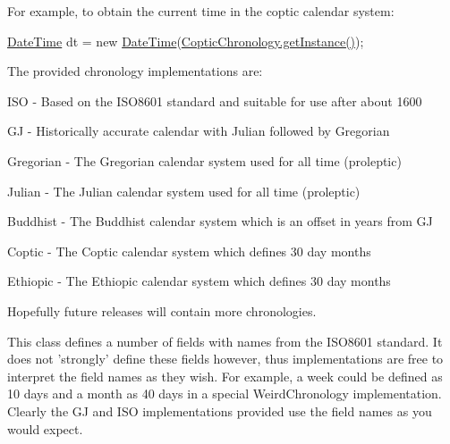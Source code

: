 For example, to obtain the current time in the coptic calendar system\-: 
\begin{DoxyPre}
\hyperlink{classorg_1_1joda_1_1time_1_1_date_time}{DateTime} dt = new \hyperlink{classorg_1_1joda_1_1time_1_1_date_time}{DateTime}(\hyperlink{classorg_1_1joda_1_1time_1_1chrono_1_1_coptic_chronology_a6818667ec3917883f817154fd5f114d9}{CopticChronology.getInstance()});
\end{DoxyPre}
 

The provided chronology implementations are\-: 
\begin{DoxyItemize}
\item I\-S\-O -\/ Based on the I\-S\-O8601 standard and suitable for use after about 1600 
\item G\-J -\/ Historically accurate calendar with Julian followed by Gregorian 
\item Gregorian -\/ The Gregorian calendar system used for all time (proleptic) 
\item Julian -\/ The Julian calendar system used for all time (proleptic) 
\item Buddhist -\/ The Buddhist calendar system which is an offset in years from G\-J 
\item Coptic -\/ The Coptic calendar system which defines 30 day months 
\item Ethiopic -\/ The Ethiopic calendar system which defines 30 day months 
\end{DoxyItemize}Hopefully future releases will contain more chronologies. 

This class defines a number of fields with names from the I\-S\-O8601 standard. It does not 'strongly' define these fields however, thus implementations are free to interpret the field names as they wish. For example, a week could be defined as 10 days and a month as 40 days in a special Weird\-Chronology implementation. Clearly the G\-J and I\-S\-O implementations provided use the field names as you would expect.

